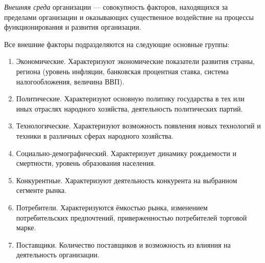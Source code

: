 \documentclass[12pt, russian, oneside, article]{ncc}
\begin{document}
\emph{Внешняя среда} организации --- совокупность факторов, находящихся за пределами организации и оказывающих существенное воздействие на процессы функционирования и развития организации.

Все внешние факторы подразделяются на следующие основные группы:
\begin{enumerate}
\item Экономические. Характеризуют экономические показатели развития страны, региона (уровень инфляции, банковская процентная ставка, система налогообложения, величина ВВП).
\item Политические. Характеризуют основную политику государства в тех или иных отраслях народного хозяйства, деятельность политических партий.
\item Технологические. Характеризуют возможность появления новых технологий и техники в различных сферах народного хозяйства.
\item Социально-демографический. Характеризует динамику рождаемости и смертности, уровень образования населения.
\item Конкурентные. Характеризуют деятельность конкурента на выбранном сегменте рынка.
\item Потребители. Характеризуются ёмкостью рынка, изменением потребительских предпочтений, приверженностью потребителей торговой марке.
\item Поставщики. Количество поставщиков и возможность из влияния на деятельность организации.
\end{enumerate}
\end{document}
